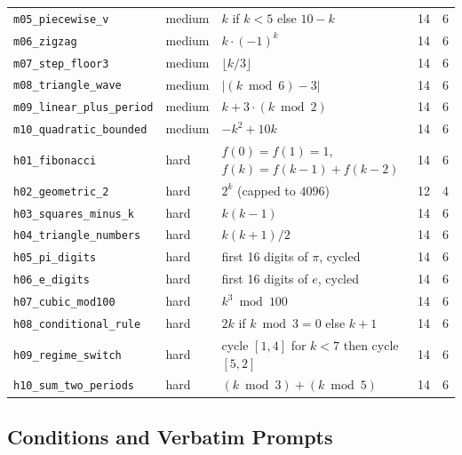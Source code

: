 \documentclass[11pt]{article}
\begin{document}
\begin{table}[t]
\begin{tabularx}{\linewidth}{l l X r r}
\texttt{m05\_piecewise\_v}         & medium & $k$ if $k < 5$ else $10 - k$                 & 14 & 6 \\
\texttt{m06\_zigzag}               & medium & $k \cdot (-1)^k$                             & 14 & 6 \\
\texttt{m07\_step\_floor3}         & medium & $\lfloor k/3 \rfloor$                        & 14 & 6 \\
\texttt{m08\_triangle\_wave}       & medium & $|(k \bmod 6) - 3|$                          & 14 & 6 \\
\texttt{m09\_linear\_plus\_period} & medium & $k + 3 \cdot (k \bmod 2)$                     & 14 & 6 \\
\texttt{m10\_quadratic\_bounded}   & medium & $-k^2 + 10k$                                 & 14 & 6 \\
\midrule
\texttt{h01\_fibonacci}            & hard   & $f(0)=f(1)=1$, $f(k)=f(k{-}1)+f(k{-}2)$       & 14 & 6 \\
\texttt{h02\_geometric\_2}         & hard   & $2^k$ (capped to $4096$)                     & 12 & 4 \\
\texttt{h03\_squares\_minus\_k}    & hard   & $k(k - 1)$                                   & 14 & 6 \\
\texttt{h04\_triangle\_numbers}    & hard   & $k(k+1)/2$                                   & 14 & 6 \\
\texttt{h05\_pi\_digits}           & hard   & first 16 digits of $\pi$, cycled             & 14 & 6 \\
\texttt{h06\_e\_digits}            & hard   & first 16 digits of $e$, cycled               & 14 & 6 \\
\texttt{h07\_cubic\_mod100}        & hard   & $k^3 \bmod 100$                              & 14 & 6 \\
\texttt{h08\_conditional\_rule}    & hard   & $2k$ if $k \bmod 3 = 0$ else $k+1$           & 14 & 6 \\
\texttt{h09\_regime\_switch}       & hard   & cycle $[1,4]$ for $k<7$ then cycle $[5,2]$    & 14 & 6 \\
\texttt{h10\_sum\_two\_periods}    & hard   & $(k \bmod 3) + (k \bmod 5)$                  & 14 & 6 \\
\bottomrule
\end{tabularx}
\end{table}

\subsection{Conditions and Verbatim Prompts}
\label{sec:prompts}
\end{document}
